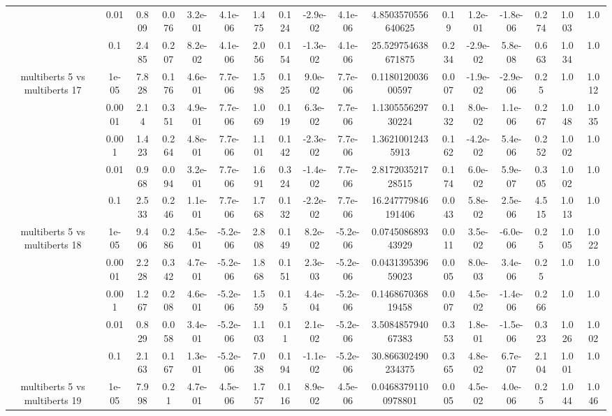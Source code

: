 \begin{tabular}{|c|c|c|c|c|c|c|c|c|c|c|c|c|c|c|c|c|}
 & 0.01 & 0.809 & 0.076 & 3.2e-01 & 4.1e-06 & 1.475 & 0.124 & -2.9e-02 & 4.1e-06 & 4.8503570556640625 & 0.19 & 1.2e-01 & -1.8e-06 & 0.274 & 1.003 & 1.0 \\
 & 0.1 & 2.485 & 0.207 & 8.2e-02 & 4.1e-06 & 2.056 & 0.154 & -1.3e-02 & 4.1e-06 & 25.529754638671875 & 0.234 & -2.9e-02 & 5.8e-08 & 0.663 & 1.034 & 1.0 \\
\hline
\multirow{5}{*}{multiberts 5 vs multiberts 17} & 1e-05 & 7.828 & 0.176 & 4.6e-01 & 7.7e-06 & 1.598 & 0.125 & 9.0e-02 & 7.7e-06 & 0.118012003600597 & 0.007 & -1.9e-02 & -2.9e-06 & 0.25 & 1.0 & 1.012 \\
 & 0.0001 & 2.14 & 0.351 & 4.9e-01 & 7.7e-06 & 1.069 & 0.119 & 6.3e-02 & 7.7e-06 & 1.130555629730224 & 0.132 & 8.0e-02 & 1.1e-06 & 0.267 & 1.048 & 1.035 \\
 & 0.001 & 1.423 & 0.264 & 4.8e-01 & 7.7e-06 & 1.101 & 0.142 & -2.3e-02 & 7.7e-06 & 1.36210012435913 & 0.162 & -4.2e-02 & 5.4e-06 & 0.252 & 1.002 & 1.0 \\
 & 0.01 & 0.968 & 0.094 & 3.2e-01 & 7.7e-06 & 1.691 & 0.324 & -1.4e-02 & 7.7e-06 & 2.817203521728515 & 0.174 & 6.0e-02 & 5.9e-07 & 0.305 & 1.002 & 1.0 \\
 & 0.1 & 2.533 & 0.246 & 1.1e-01 & 7.7e-06 & 1.768 & 0.132 & -2.2e-02 & 7.7e-06 & 16.247779846191406 & 0.043 & 5.8e-02 & 2.5e-06 & 4.515 & 1.013 & 1.0 \\
\hline
\multirow{5}{*}{multiberts 5 vs multiberts 18} & 1e-05 & 9.406 & 0.286 & 4.5e-01 & -5.2e-06 & 2.808 & 0.149 & 8.2e-02 & -5.2e-06 & 0.074508689343929 & 0.011 & 3.5e-02 & -6.0e-06 & 0.25 & 1.005 & 1.022 \\
 & 0.0001 & 2.228 & 0.342 & 4.7e-01 & -5.2e-06 & 1.868 & 0.151 & 2.3e-03 & -5.2e-06 & 0.043139539659023 & 0.005 & 8.0e-03 & 3.4e-06 & 0.25 & 1.0 & 1.0 \\
 & 0.001 & 1.267 & 0.208 & 4.6e-01 & -5.2e-06 & 1.559 & 0.15 & 4.4e-04 & -5.2e-06 & 0.146867036819458 & 0.007 & 4.5e-02 & -1.4e-06 & 0.266 & 1.0 & 1.0 \\
 & 0.01 & 0.829 & 0.058 & 3.4e-01 & -5.2e-06 & 1.103 & 0.11 & 2.1e-02 & -5.2e-06 & 3.508485794067383 & 0.353 & 1.8e-01 & -1.5e-06 & 0.323 & 1.026 & 1.002 \\
 & 0.1 & 2.163 & 0.167 & 1.3e-01 & -5.2e-06 & 7.038 & 0.194 & -1.1e-02 & -5.2e-06 & 30.866302490234375 & 0.365 & 4.8e-02 & 6.7e-07 & 2.104 & 1.001 & 1.0 \\
\hline
\multirow{5}{*}{multiberts 5 vs multiberts 19} & 1e-05 & 7.998 & 0.21 & 4.7e-01 & 4.5e-06 & 1.757 & 0.116 & 8.9e-02 & 4.5e-06 & 0.04683791100978801 & 0.005 & 4.5e-02 & 4.0e-06 & 0.25 & 1.044 & 1.046 \\

\end{tabular}

